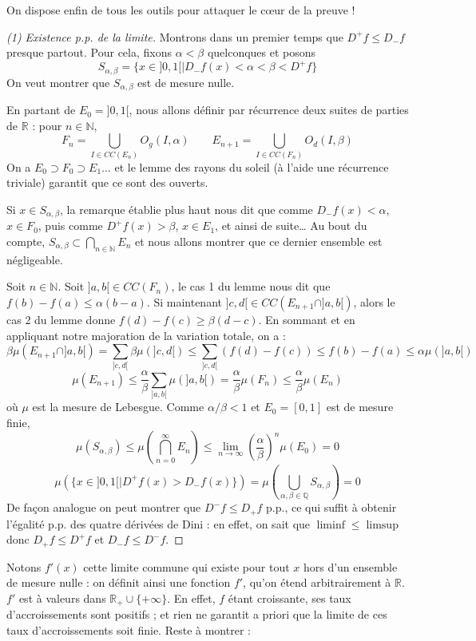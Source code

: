 \documentclass[a4paper, 11pt]{article}
\def\N{\mathbb{N}}
\def\Q{\mathbb{Q}}
\def\R{\mathbb{R}}
\begin{document}
On dispose enfin de tous les outils pour attaquer le cœur de la preuve !

\begin{proof}[(1) Existence p.p. de la limite]
Montrons dans un premier temps que $D^+f \leq D_-f$ presque partout. Pour cela,
fixons $\alpha < \beta$ quelconques et posons
\[ S_{\alpha,\beta} = \{ x \in ]0,1[ \mid D_-f(x) < \alpha < \beta < D^+f \} \]
On veut montrer que $S_{\alpha,\beta}$ est de mesure nulle.

En partant de $E_0 = ]0,1[$, nous allons définir par récurrence deux suites de
parties de $\R$ : pour $n \in \N$,
\[ F_n = \bigcup_{I \in CC(E_n)} O_g(I, \alpha) \qquad
   E_{n+1} = \bigcup_{I \in CC(F_n)} O_d(I, \beta) \]
On a $E_0 \supset F_0 \supset E_1 \ldots$ et le lemme des rayons du soleil (à
l'aide une récurrence triviale) garantit que ce sont des ouverts. 

Si $x \in S_{\alpha,\beta}$, la remarque établie plus haut nous dit que comme
$D_-f(x) < \alpha$, $x \in F_0$, puis comme $D^+f(x) > \beta$, $x \in E_1$, et
ainsi de suite… Au bout du compte, $S_{\alpha,\beta} \subset \bigcap_{n \in \N}
E_n$ et nous allons montrer que ce dernier ensemble est négligeable.

Soit $n \in \N$. Soit $]a,b[ \in CC(F_n)$, le cas 1 du lemme nous dit que
$f(b) - f(a) \leq \alpha(b-a)$. Si maintenant $]c,d[ \in CC(E_{n+1} \cap
]a,b[)$, alors le cas 2 du lemme donne $f(d)-f(c) \geq \beta(d-c)$. En sommant
et en appliquant notre majoration de la variation totale, on a :
\[ \beta\mu(E_{n+1} \cap ]a,b[) = \sum_{]c,d[} \beta\mu(]c,d[) \leq \sum_{]c,d[}
  (f(d) - f(c)) \leq f(b) - f(a) \leq \alpha\mu(]a,b[) \]
\[ \mu(E_{n+1}) \leq \frac{\alpha}{\beta} \sum_{]a,b[} \mu(]a,b[) =
  \frac{\alpha}{\beta} \mu(F_n) \leq \frac{\alpha}{\beta} \mu(E_n) \] où $\mu$
est la mesure de Lebesgue. Comme $\alpha/\beta < 1$ et $E_0 = [0,1]$ est de
mesure finie,
\[ \mu(S_{\alpha,\beta}) \leq \mu \left( \bigcap_{n=0}^\infty E_n \right)
  \leq \lim_{n \to \infty} \left( \frac{\alpha}{\beta} \right)^n \mu(E_0) = 0 \]
\[ \mu\left( \{x \in ]0,1[ \mid  D^+f(x) > D_-f(x) \} \right)
  = \mu\left( \bigcup_{\alpha, \beta \in \Q} S_{\alpha,\beta} \right)
  = 0 \]
De façon analogue on peut montrer que $D^-f \leq D_+f$ p.p., ce qui suffit à
obtenir l'égalité p.p. des quatre dérivées de Dini : en effet, on sait que
$\liminf \leq \limsup$ donc $D_+f \leq D^+f$ et $D_-f \leq D^-f$.
\end{proof}

Notons $f'(x)$ cette limite commune qui existe pour tout $x$ hors d'un ensemble
de mesure nulle : on définit ainsi une fonction $f'$, qu'on étend arbitrairement
à $\R$. $f'$ est à valeurs dans $\R_+ \cup \{+\infty\}$. En effet, $f$ étant
croissante, ses taux d'accroissements sont positifs ; et rien ne garantit a
priori que la limite de ces taux d'accroissements soit finie. Reste à montrer :
\end{document}
